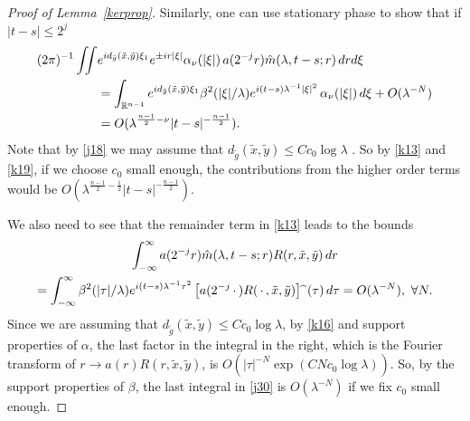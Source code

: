 \documentclass[10pt]{amsart}
\newcommand{\la}{\lambda}
\newcommand{\1}{{\bf 1}}
\begin{document}
\begin{proof}[Proof of Lemma~\ref{kerprop}]
Similarly, one can use stationary phase to show that if $ |t-s|\le 2^j $
\begin{equation}
    \begin{aligned}
        (2\pi)^{-1} \iint &e^{id_{\tilde g}(\tilde x,\tilde y)\xi_1} e^{\pm ir|\xi|} \alpha_\nu(|\xi|) \, a(2^{-j}r)\Hat m(\la,t-s;r) \, dr d\xi
\\
&=\int_{{\mathbb R}^{n-1}} e^{id_{\tilde g}(\tilde x,\tilde y)\xi_1} \beta^2(|\xi|/\la) e^{i(t-s)\la^{-1}|\xi|^2} \, \alpha_\nu(|\xi|) \, d\xi
+O(\la^{-N})\\
&=O(\la^{\frac{n-1}2-\nu}|t-s|^{-\frac{n-1}2}).
    \end{aligned}
\end{equation}
Note that  by \eqref{j18}
we may assume that $d_{\tilde g}(\tilde x,\tilde y)\le Cc_0\log\la$ .  So by \eqref{k13} and \eqref{k19}, if we choose $c_0$ small enough, the contributions from the higher order terms would
be
$O(\la^{\frac{n-1}2-\frac12}|t-s|^{-\frac{n-1}2})$.


We also need to see that the remainder term in \eqref{k13} leads to the bounds
\begin{multline}\label{j30}
\int^\infty_{-\infty} a(2^{-j}r)\Hat m(\la,t-s;r) R(r,\tilde x,\tilde y) \, dr
\\
=\int^\infty_{-\infty} \beta^2(|\tau|/\la) e^{i(t-s)\la^{-1}\tau^2} \, 
\bigl[ a(2^{-j}\, \cdot \, )R(\, \cdot\, ,\tilde x,\tilde y)\bigr]\, \widehat{}\, \,(\tau) \, d\tau =O(\la^{-N}), \, \, \forall N.
\end{multline}
Since we are assuming that $d_{\tilde g}(\tilde x,\tilde y)\le Cc_0\log\la$,
by \eqref{k16} and support properties of $\alpha$, the last factor in the integral in the right, which is the Fourier transform of
$r\to a(r)R(r,\tilde x,\tilde y)$, is $O(|\tau|^{-N}\exp(CNc_0\log\la))$.  So, by the support properties of $\beta$, the last integral
in \eqref{j30} is $O(\la^{-N})$ if we fix $c_0$ small enough.
\end{proof}
\end{document}

